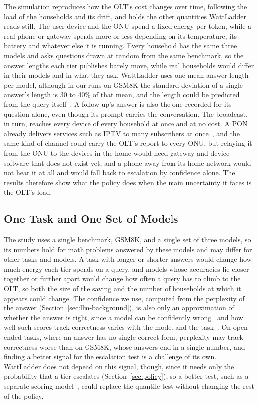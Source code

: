 \documentclass[cic,dipl,english]{infufrgs}
\begin{document}
The simulation reproduces how the OLT's cost changes over time, following the load of the
households and its drift, and holds the other quantities WattLadder reads still. The user
device and the ONU spend a fixed energy per token, while a real phone or gateway spends more
or less depending on its temperature, its battery and whatever else it is running. Every
household has the same three models and asks questions drawn at random from the same
benchmark, so the answer lengths each tier publishes barely move, while real households
would differ in their models and in what they ask. WattLadder uses one mean answer length per
model, although in our runs on GSM8K the standard deviation of a single answer's length is 30
to 40\% of that mean, and the length could be predicted from the query itself~\cite{zheng2023response}.
A follow-up's answer is also the one recorded for its question alone, even though its prompt
carries the conversation. The broadcast, in turn, reaches every device of every household at
once and at no cost. A PON already delivers services such as IPTV to many subscribers at
once~\cite{effenberger2007introduction}, and the same kind of channel could carry the OLT's
report to every ONU, but relaying it from the ONU to the devices in the home would need gateway
and device software that does not exist yet, and a phone away from its home network would not
hear it at all and would fall back to escalation by confidence alone. The results therefore show
what the policy does when the main uncertainty it faces is the OLT's load.

\subsection{One Task and One Set of Models}

The study uses a single benchmark, GSM8K, and a single set of three models, so its numbers hold
for math problems answered by these models and may differ for other tasks and models. A task
with longer or shorter answers would change how much energy each tier spends on a query, and
models whose accuracies lie closer together or further apart would change how often a query has
to climb to the OLT, so both the size of the saving and the number of households at which it
appears could change. The confidence we use, computed from the perplexity of the answer
(Section~\ref{sec:llm-background}), is also only an approximation of whether the answer is
right, since a model can be confidently wrong~\cite{guo2017calibration} and how well such scores
track correctness varies with the model and the task~\cite{geng2023survey}. On open-ended tasks,
where an answer has no single correct form, perplexity may track correctness worse than on
GSM8K, whose answers end in a single number, and finding a better signal for the escalation test
is a challenge of its own. WattLadder does not depend on this signal, though, since it needs
only the probability that a tier escalates (Section~\ref{sec:policy}), so a better test, such as
a separate scoring model~\cite{chen2024frugalgpt}, could replace the quantile test without
changing the rest of the policy.
\end{document}
